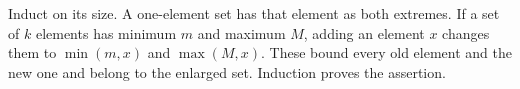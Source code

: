 Induct on its size. A one-element set has that element as both extremes. If a set of $k$ elements has minimum $m$ and maximum $M$, adding an element $x$ changes them to $\min(m,x)$ and $\max(M,x)$. These bound every old element and the new one and belong to the enlarged set. Induction proves the assertion.
